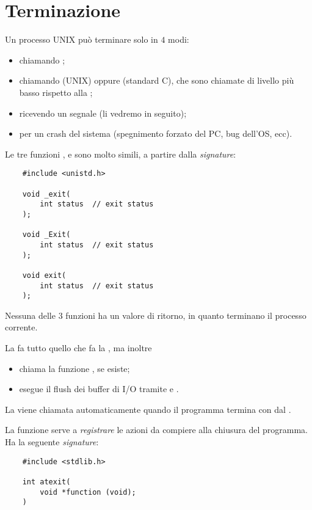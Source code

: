 \section{Terminazione}

Un processo UNIX può terminare solo in $4$ modi:
\begin{itemize}
    \item chiamando ;
    \item chiamando  (UNIX) oppure  (standard C), che sono chiamate di livello più basso rispetto alla ;
    \item ricevendo un segnale (li vedremo in seguito);
    \item per un crash del sistema (spegnimento forzato del PC, bug dell'OS, ecc).
\end{itemize}

Le tre funzioni ,  e  sono molto simili, a partire dalla \emph{signature}:
\begin{verbatim}
    #include <unistd.h>

    void _exit(
        int status  // exit status
    );
    
    void _Exit(
        int status  // exit status
    );
    
    void exit(
        int status  // exit status
    );
\end{verbatim}

Nessuna delle $3$ funzioni ha un valore di ritorno, in quanto terminano il processo corrente.

La  fa tutto quello che fa la , ma inoltre \begin{itemize}
    \item chiama la funzione , se esiste;
    \item esegue il flush dei buffer di \textsf{I/O} tramite  e .
\end{itemize}

La  viene chiamata automaticamente quando il programma termina con  dal .

 La funzione  serve a \emph{registrare} le azioni da compiere alla chiusura del programma. Ha la seguente \emph{signature}:
\begin{verbatim}
    #include <stdlib.h>

    int atexit(
        void *function (void); 
    )
\end{verbatim}

